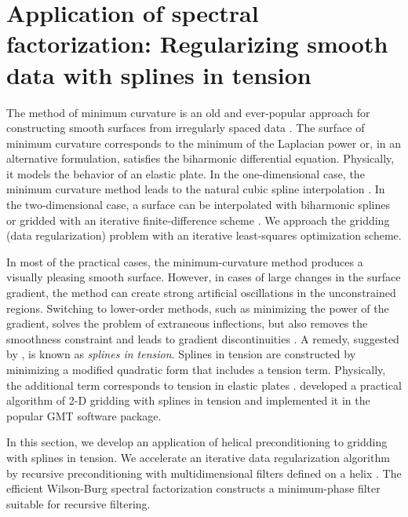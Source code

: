 \section{Application of spectral factorization: \newline
  Regularizing smooth data with splines in tension}


The method of minimum curvature is an old and ever-popular approach
for constructing smooth surfaces from irregularly spaced data
\cite{GEO39.01.00390048}. The surface of minimum curvature corresponds
to the minimum of the Laplacian power or, in an alternative
formulation, satisfies the biharmonic differential equation.
Physically, it models the behavior of an elastic plate. In the
one-dimensional case, the minimum curvature method leads to the
natural cubic spline interpolation \cite{deBoor}. In the
two-dimensional case, a surface can be interpolated with biharmonic
splines \cite{sandwell} or gridded with an iterative finite-difference
scheme \cite{swain}.  We approach the gridding (data regularization)
problem with an iterative least-squares optimization scheme.
\par
In most of the practical cases, the minimum-curvature method produces
a visually pleasing smooth surface. However, in cases of large changes
in the surface gradient, the method can create strong artificial
oscillations in the unconstrained regions. Switching to lower-order
methods, such as minimizing the power of the gradient, solves the
problem of extraneous inflections, but also removes the smoothness
constraint and leads to gradient discontinuities
\cite{galilee}. A remedy, suggested by ,
is known as \emph{splines in tension}. Splines in tension are
constructed by minimizing a modified quadratic form that includes a
tension term. Physically, the additional term corresponds to tension
in elastic plates \cite{timoshenko}. 
developed a practical algorithm of 2-D gridding with splines in
tension and implemented it in the popular GMT software
package.
\par
In this section, we develop an application of helical preconditioning
to gridding with splines in tension. We accelerate an iterative data
regularization algorithm by recursive preconditioning with
multidimensional filters defined on a helix \cite{precon}. The
efficient Wilson-Burg spectral factorization constructs a
minimum-phase filter suitable for recursive filtering.

